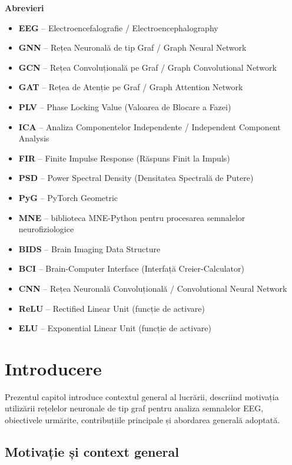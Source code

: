 \documentclass[12pt,a4paper]{report}
\theoremstyle{definition}
\theoremstyle{remark}
\begin{document}
\vspace{8pt}
\noindent\textbf{Abrevieri}
\begin{itemize}
    \item \textbf{EEG} -- Electroencefalografie / Electroencephalography
    \item \textbf{GNN} -- Rețea Neuronală de tip Graf / Graph Neural Network
    \item \textbf{GCN} -- Rețea Convoluțională pe Graf / Graph Convolutional Network
    \item \textbf{GAT} -- Rețea de Atenție pe Graf / Graph Attention Network
    \item \textbf{PLV} -- Phase Locking Value (Valoarea de Blocare a Fazei)
    \item \textbf{ICA} -- Analiza Componentelor Independente / Independent Component Analysis
    \item \textbf{FIR} -- Finite Impulse Response (Răspuns Finit la Impuls)
    \item \textbf{PSD} -- Power Spectral Density (Densitatea Spectrală de Putere)
    \item \textbf{PyG} -- PyTorch Geometric
    \item \textbf{MNE} -- biblioteca MNE-Python pentru procesarea semnalelor neurofiziologice
    \item \textbf{BIDS} -- Brain Imaging Data Structure
    \item \textbf{BCI} -- Brain-Computer Interface (Interfață Creier-Calculator)
    \item \textbf{CNN} -- Rețea Neuronală Convoluțională / Convolutional Neural Network
    \item \textbf{ReLU} -- Rectified Linear Unit (funcție de activare)
    \item \textbf{ELU} -- Exponential Linear Unit (funcție de activare)
\end{itemize}

\tableofcontents
\newpage
\chapter{Introducere}

Prezentul capitol introduce contextul general al lucrării, descriind motivația utilizării rețelelor neuronale de tip graf pentru analiza semnalelor EEG, obiectivele urmărite, contribuțiile principale și abordarea generală adoptată.

\section{Motivație și context general}
\end{document}
